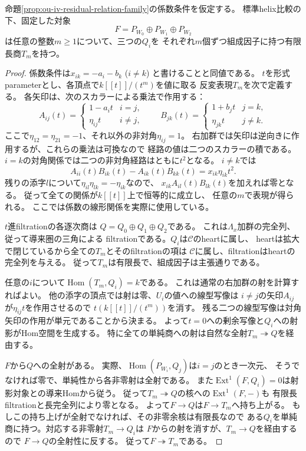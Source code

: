 \begin{lemma}[固定したhelix対象の任意長の有限長商]
\label{lem:ou-iv-periodic-thickenings}
命題\ref{prop:ou-iv-residual-relation-family}の係数条件を仮定する。
標準helix比較の下、固定した対象
\[
 F=P_{W_0}\oplus P_{W_1}\oplus P_{W_2}
\]
は任意の整数$m\geq1$について、三つの$Q_i$を
それぞれ$m$個ずつ組成因子に持つ有限長商$T_m$を持つ。
\end{lemma}
\begin{proof}
係数条件は$x_{ik}=-a_i-b_k$ ($i\ne k$) と書けることと同値である。
$t$を形式parameterとし、各頂点で$k[[t]]/(t^m)$を値に取る
反変表現$T_m$を次で定義する。
各矢印は、次のスカラーによる乗法で作用する：
\[
 A_{ij}(t)=
 \begin{cases}1-a_i t&i=j,\\ \eta_{ij}t&i\ne j,\end{cases}
 \qquad
 B_{jk}(t)=
 \begin{cases}1+b_j t&j=k,\\ \eta_{jk}t&j\ne k.\end{cases}
\]
ここで$\eta_{12}=\eta_{21}=-1$、それ以外の非対角$\eta_{ij}=1$。
右加群では矢印は逆向きに作用するが、これらの乗法は可換なので
経路の値は二つのスカラーの積である。
$i=k$の対角関係では二つの非対角経路はともに$t^2$となる。
$i\ne k$では
\[
 A_{ii}(t)B_{ik}(t)-A_{ik}(t)B_{kk}(t)
   =x_{ik}\eta_{ik}t^2.
\]
残りの添字$l$について$\eta_{il}\eta_{lk}=-\eta_{ik}$なので、
$x_{ik}A_{il}(t)B_{lk}(t)$を加えれば零となる。
従って全ての関係が$k[[t]]$上で恒等的に成立し、
任意の$m$で表現が得られる。
ここでは係数の線形関係を実際に使用している。

$t$進filtrationの各逐次商は
$Q=Q_0\oplus Q_1\oplus Q_2$である。
これは$\Lambda_x$加群の完全列、従って導来圏の三角による
filtrationである。$Q_i$は$\mathcal C$のheartに属し、
heartは拡大で閉じているから全ての$T_m$とそのfiltrationの項は
$\mathcal C$に属し、filtrationはheartの完全列を与える。
従って$T_m$は有限長で、組成因子は主張通りである。

任意の$i$について$\operatorname{Hom}(T_m,Q_i)=k$である。
これは通常の右加群の射を計算すればよい。
他の添字の頂点では射は零、$U_i$の値への線型写像は
$i\ne j$の矢印$A_{ij}$が$\eta_{ij}t$を作用させるので
$t(k[[t]]/(t^m))$を消す。
残る二つの線型写像は対角矢印の作用が単元であることから決まる。
よって$t=0$への剰余写像と$Q_i$への射影がHom空間を生成する。
特に全ての単純商への射は自然な全射$T_m\twoheadrightarrow Q$を経由する。

$F$から$Q$への全射がある。
実際、$\operatorname{Hom}(P_{W_i},Q_j)$は$i=j$のとき一次元、
そうでなければ零で、単純性から各非零射は全射である。
また$\operatorname{Ext}^1(F,Q_i)=0$は射影対象との導来Homから従う。
従って$T_m\twoheadrightarrow Q$の核への$\operatorname{Ext}^1(F,-)$も
有限長filtrationと長完全列により零となる。
よって$F\to Q$は$F\to T_m$へ持ち上がる。
もしこの持ち上げが全射でなければ、その非零余核は有限長なので
ある$Q_i$を単純商に持つ。対応する非零射$T_m\to Q_i$は
$F$からの射を消すが、$T_m\to Q$を経由するので
$F\to Q$の全射性に反する。
従って$F\twoheadrightarrow T_m$である。
\end{proof}

